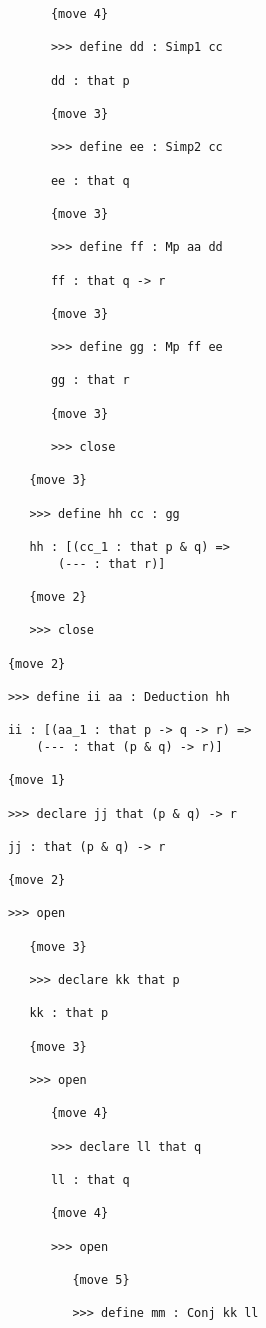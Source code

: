 \documentclass[12pt]{article}
\begin{document}
\begin{verbatim}
            {move 4}

            >>> define dd : Simp1 cc

            dd : that p

            {move 3}

            >>> define ee : Simp2 cc

            ee : that q

            {move 3}

            >>> define ff : Mp aa dd

            ff : that q -> r

            {move 3}

            >>> define gg : Mp ff ee

            gg : that r

            {move 3}

            >>> close

         {move 3}

         >>> define hh cc : gg

         hh : [(cc_1 : that p & q) => 
             (--- : that r)]

         {move 2}

         >>> close

      {move 2}

      >>> define ii aa : Deduction hh

      ii : [(aa_1 : that p -> q -> r) => 
          (--- : that (p & q) -> r)]

      {move 1}

      >>> declare jj that (p & q) -> r

      jj : that (p & q) -> r

      {move 2}

      >>> open

         {move 3}

         >>> declare kk that p

         kk : that p

         {move 3}

         >>> open

            {move 4}

            >>> declare ll that q

            ll : that q

            {move 4}

            >>> open

               {move 5}

               >>> define mm : Conj kk ll


\end{verbatim}
\end{document}
